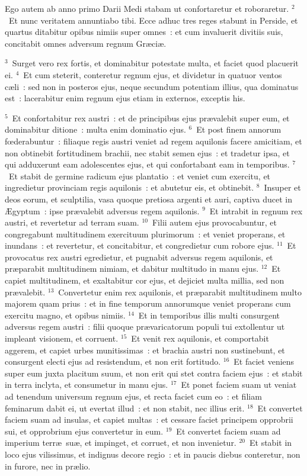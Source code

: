 \lettrine[lines=10,image=true,loversize=0.05,lraise=-0.03]{E}{}go autem ab anno primo Darii Medi stabam ut confortaretur et roboraretur.
${}^{2}$~Et nunc veritatem annuntiabo tibi. Ecce adhuc tres reges stabunt in Perside, et quartus ditabitur opibus nimiis super omnes~: et cum invaluerit divitiis suis, concitabit omnes adversum regnum Gr\ae ci\ae .


${}^{3}$~Surget vero rex fortis, et dominabitur potestate multa, et faciet quod placuerit ei.
${}^{4}$~Et cum steterit, conteretur regnum ejus, et dividetur in quatuor ventos c\ae li~: sed non in posteros ejus, neque secundum potentiam illius, qua dominatus est~: lacerabitur enim regnum ejus etiam in externos, exceptis his.


${}^{5}$~Et confortabitur rex austri~: et de principibus ejus pr\ae valebit super eum, et dominabitur ditione~: multa enim dominatio ejus.
${}^{6}$~Et post finem annorum fœderabuntur~: filiaque regis austri veniet ad regem aquilonis facere amicitiam, et non obtinebit fortitudinem brachii, nec stabit semen ejus~: et tradetur ipsa, et qui adduxerunt eam adolescentes ejus, et qui confortabant eam in temporibus.
${}^{7}$~Et stabit de germine radicum ejus plantatio~: et veniet cum exercitu, et ingredietur provinciam regis aquilonis~: et abutetur eis, et obtinebit.
${}^{8}$~Insuper et deos eorum, et sculptilia, vasa quoque pretiosa argenti et auri, captiva ducet in \AE gyptum~: ipse pr\ae valebit adversus regem aquilonis.
${}^{9}$~Et intrabit in regnum rex austri, et revertetur ad terram suam.
${}^{10}$~Filii autem ejus provocabuntur, et congregabunt multitudinem exercituum plurimorum~: et veniet properans, et inundans~: et revertetur, et concitabitur, et congredietur cum robore ejus.
${}^{11}$~Et provocatus rex austri egredietur, et pugnabit adversus regem aquilonis, et pr\ae parabit multitudinem nimiam, et dabitur multitudo in manu ejus.
${}^{12}$~Et capiet multitudinem, et exaltabitur cor ejus, et dejiciet multa millia, sed non pr\ae valebit.
${}^{13}$~Convertetur enim rex aquilonis, et pr\ae parabit multitudinem multo majorem quam prius~: et in fine temporum annorumque veniet properans cum exercitu magno, et opibus nimiis.
${}^{14}$~Et in temporibus illis multi consurgent adversus regem austri~: filii quoque pr\ae varicatorum populi tui extollentur ut impleant visionem, et corruent.
${}^{15}$~Et venit rex aquilonis, et comportabit aggerem, et capiet urbes munitissimas~: et brachia austri non sustinebunt, et consurgent electi ejus ad resistendum, et non erit fortitudo.
${}^{16}$~Et faciet veniens super eum juxta placitum suum, et non erit qui stet contra faciem ejus~: et stabit in terra inclyta, et consumetur in manu ejus.
${}^{17}$~Et ponet faciem suam ut veniat ad tenendum universum regnum ejus, et recta faciet cum eo~: et filiam feminarum dabit ei, ut evertat illud~: et non stabit, nec illius erit.
${}^{18}$~Et convertet faciem suam ad insulas, et capiet multas~: et cessare faciet principem opprobrii sui, et opprobrium ejus convertetur in eum.
${}^{19}$~Et convertet faciem suam ad imperium terr\ae\ su\ae , et impinget, et corruet, et non invenietur.
${}^{20}$~Et stabit in loco ejus vilissimus, et indignus decore regio~: et in paucis diebus conteretur, non in furore, nec in pr\ae lio.


